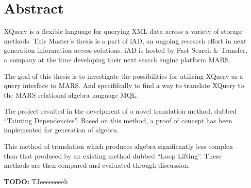 \chapter*{Abstract}

XQuery is a flexible language for querying XML data across a variety of storage
methods. This Master's thesis is a part of iAD, an ongoing research effort in next generation information access
solutions. iAD is hosted by Fast Search \& Transfer, a company at the time developing their next search engine
platform MARS.

The goal of this thesis is to investigate the possibilities for utilising
XQuery as a query interface to MARS. And specififcally to find a way to translate XQuery to the MARS relational algebra language MQL.

The project resulted in the develpment of a novel translation method, dubbed ``Tainting Dependencies''.
Based on this method, a proof of concept has been implemented for generation of algebra.

This method of translation which produces algebra significantly less complex than that produced by an existing
method dubbed ``Loop Lifting''. These methods are then compared and evaluated through discussion.

\textbf{\LARGE TODO:} TJeeeeeeeeh
